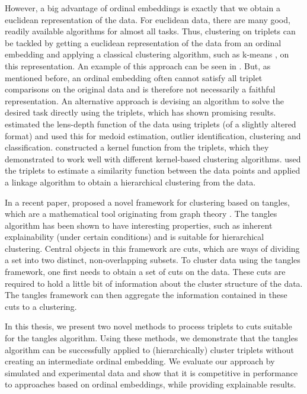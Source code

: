 However, a big advantage of ordinal embeddings is exactly that we obtain a euclidean representation of the data. 
For euclidean data, there are many good, readily available algorithms for almost all tasks. 
Thus, clustering on triplets can be tackled by getting a euclidean representation of the data
from an ordinal embedding and applying a classical clustering algorithm, such as k-means \citep{lloydLeastSquaresQuantization1982}, on 
this representation. An example of this approach can be seen in \cite{kleindessnerLensDepthFunction2017}. But, as mentioned before, an ordinal embedding 
often cannot satisfy all triplet comparisons on the original data and is therefore not 
necessarily a faithful representation. 
An alternative approach is devising an algorithm to solve the desired task directly 
using the triplets, which has shown promising results.
\cite{kleindessnerLensDepthFunction2017} estimated the lens-depth function
of the data using triplets (of a slightly altered format) and used this for 
medoid estimation, outlier identification, clustering and classification. 
\cite{kleindessnerKernelFunctionsBased2017} constructed a kernel function from
the triplets, which they demonstrated to work well with 
different kernel-based clustering algorithms.
\cite{ghoshdastidarFoundationsComparisonBasedHierarchical2019} used the 
triplets to estimate a similarity function between the data points and applied 
a linkage algorithm to obtain a hierarchical clustering from the data.

In a recent paper, \cite{klepperClusteringTanglesAlgorithmic2021} proposed a novel framework
for clustering based on tangles, which are a mathematical tool originating from graph theory 
\citep{robertsonGraphMinorsObstructions1991}. The tangles algorithm has been shown to have 
interesting properties, such as inherent explainability (under certain conditions) and is suitable for hierarchical clustering.
Central objects in this framework are cuts, which are ways of dividing a set into
two distinct, non-overlapping subsets. To cluster data using the tangles framework, one first
needs to obtain a set of cuts on the data. These cuts are required to
hold a little bit of information about the cluster structure of the data. The 
tangles framework can then aggregate the information contained in these cuts to a
clustering. 

In this thesis, we present two novel methods to process triplets to cuts suitable for the
tangles algorithm. Using these methods, we 
demonstrate that the tangles algorithm can be successfully applied to (hierarchically) cluster triplets without creating an intermediate ordinal embedding. 
We evaluate our approach by simulated and experimental data and show that it is competitive 
in performance to approaches based on ordinal embeddings, while providing explainable results. 


